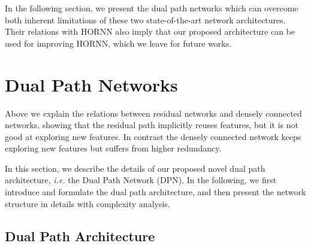 \documentclass{article}
\begin{document}
\vskip -0.03in
In the following section, we present the dual path networks which can overcome both inherent limitations of these two state-of-the-art network architectures. Their relations with HORNN also imply that our proposed architecture can be used for improving HORNN, which we leave for future works.



% 
%
%
%

\vskip -0.03in
\section{Dual Path Networks}

\vskip -0.03in
Above we explain the relations between residual networks and densely connected networks, showing that the residual path implicitly reuses features, but it is not good at exploring new features. In contrast the densely connected network keeps exploring new features but suffers from higher redundancy. 

In this section, we describe the details of our proposed novel dual path architecture, \emph{i.e.} the Dual Path Network (DPN). In the following, we first introduce and formulate the dual path architecture, and then present the network structure in details with complexity analysis.


\subsection{Dual Path Architecture}
\end{document}
